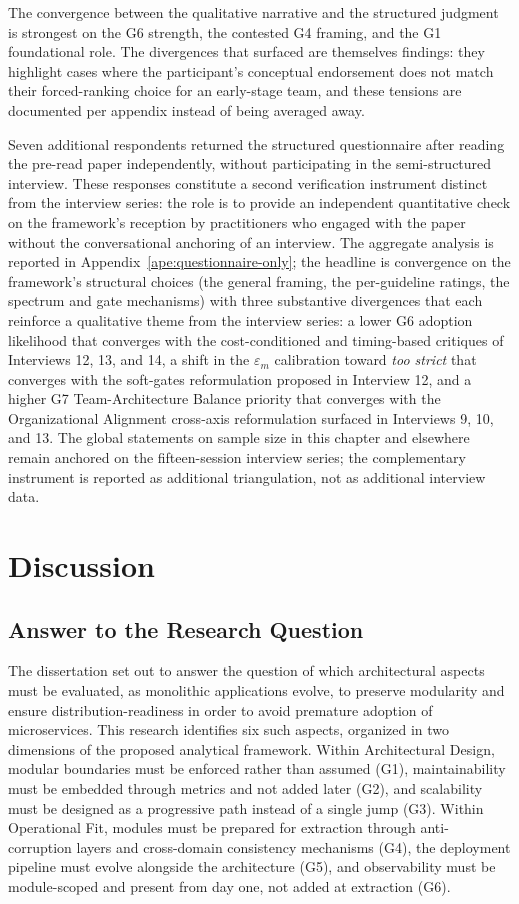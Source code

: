 The convergence between the qualitative narrative and the structured judgment is strongest on the G6 strength, the contested G4 framing, and the G1 foundational role. The divergences that surfaced are themselves findings: they highlight cases where the participant's conceptual endorsement does not match their forced-ranking choice for an early-stage team, and these tensions are documented per appendix instead of being averaged away.

Seven additional respondents returned the structured questionnaire after reading the pre-read paper independently, without participating in the semi-structured interview. These responses constitute a second verification instrument distinct from the interview series: the role is to provide an independent quantitative check on the framework's reception by practitioners who engaged with the paper without the conversational anchoring of an interview. The aggregate analysis is reported in Appendix~\ref{ape:questionnaire-only}; the headline is convergence on the framework's structural choices (the general framing, the per-guideline ratings, the spectrum and gate mechanisms) with three substantive divergences that each reinforce a qualitative theme from the interview series: a lower G6 adoption likelihood that converges with the cost-conditioned and timing-based critiques of Interviews 12, 13, and 14, a shift in the $\varepsilon_m$ calibration toward \emph{too strict} that converges with the soft-gates reformulation proposed in Interview 12, and a higher G7 Team-Architecture Balance priority that converges with the Organizational Alignment cross-axis reformulation surfaced in Interviews 9, 10, and 13. The global statements on sample size in this chapter and elsewhere remain anchored on the fifteen-session interview series; the complementary instrument is reported as additional triangulation, not as additional interview data.

\section{Discussion}

\subsection*{Answer to the Research Question}

The dissertation set out to answer the question of which architectural aspects must be evaluated, as monolithic applications evolve, to preserve modularity and ensure distribution-readiness in order to avoid premature adoption of microservices. This research identifies six such aspects, organized in two dimensions of the proposed analytical framework. Within Architectural Design, modular boundaries must be enforced rather than assumed (G1), maintainability must be embedded through metrics and not added later (G2), and scalability must be designed as a progressive path instead of a single jump (G3). Within Operational Fit, modules must be prepared for extraction through anti-corruption layers and cross-domain consistency mechanisms (G4), the deployment pipeline must evolve alongside the architecture (G5), and observability must be module-scoped and present from day one, not added at extraction (G6).

